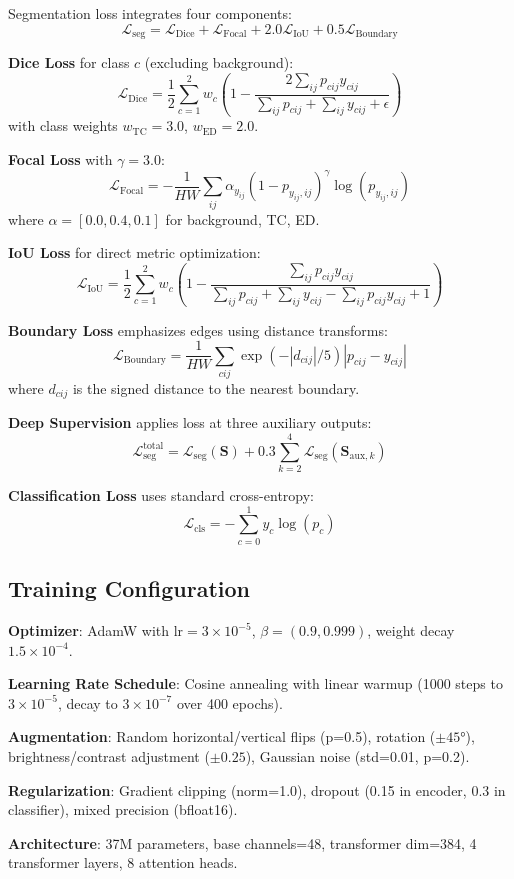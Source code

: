 Segmentation loss integrates four components:
\begin{equation}
\mathcal{L}_{\text{seg}} = \mathcal{L}_{\text{Dice}} + \mathcal{L}_{\text{Focal}} + 2.0\mathcal{L}_{\text{IoU}} + 0.5\mathcal{L}_{\text{Boundary}}
\label{eq:seg_loss}
\end{equation}

\textbf{Dice Loss} for class $c$ (excluding background):
\[
\mathcal{L}_{\text{Dice}} = \frac{1}{2}\sum_{c=1}^{2} w_c \left(1 - \frac{2\sum_{ij} p_{cij} y_{cij}}{\sum_{ij} p_{cij} + \sum_{ij} y_{cij} + \epsilon}\right)
\]
with class weights $w_{\text{TC}}=3.0$, $w_{\text{ED}}=2.0$.

\textbf{Focal Loss} with $\gamma=3.0$:
\[
\mathcal{L}_{\text{Focal}} = -\frac{1}{HW}\sum_{ij} \alpha_{y_{ij}} (1-p_{y_{ij},ij})^{\gamma} \log(p_{y_{ij},ij})
\]
where $\alpha = [0.0, 0.4, 0.1]$ for background, TC, ED.

\textbf{IoU Loss} for direct metric optimization:
\[
\mathcal{L}_{\text{IoU}} = \frac{1}{2}\sum_{c=1}^{2} w_c \left(1 - \frac{\sum_{ij} p_{cij} y_{cij}}{\sum_{ij} p_{cij} + \sum_{ij} y_{cij} - \sum_{ij} p_{cij} y_{cij} + 1}\right)
\]

\textbf{Boundary Loss} emphasizes edges using distance transforms:
\[
\mathcal{L}_{\text{Boundary}} = \frac{1}{HW}\sum_{cij} \exp(-|d_{cij}|/5) |p_{cij} - y_{cij}|
\]
where $d_{cij}$ is the signed distance to the nearest boundary.

\textbf{Deep Supervision} applies loss at three auxiliary outputs:
\[
\mathcal{L}_{\text{seg}}^{\text{total}} = \mathcal{L}_{\text{seg}}(\mathbf{S}) + 0.3\sum_{k=2}^{4} \mathcal{L}_{\text{seg}}(\mathbf{S}_{\text{aux},k})
\]

\textbf{Classification Loss} uses standard cross-entropy:
\[
\mathcal{L}_{\text{cls}} = -\sum_{c=0}^{1} y_c \log(p_c)
\]

\subsection{Training Configuration}

\textbf{Optimizer}: AdamW with $\text{lr}=3\times10^{-5}$, $\beta=(0.9, 0.999)$, weight decay $1.5\times10^{-4}$.

\textbf{Learning Rate Schedule}: Cosine annealing with linear warmup (1000 steps to $3\times10^{-5}$, decay to $3\times10^{-7}$ over 400 epochs).

\textbf{Augmentation}: Random horizontal/vertical flips (p=0.5), rotation ($\pm45°$), brightness/contrast adjustment ($\pm0.25$), Gaussian noise (std=0.01, p=0.2).

\textbf{Regularization}: Gradient clipping (norm=1.0), dropout (0.15 in encoder, 0.3 in classifier), mixed precision (bfloat16).

\textbf{Architecture}: 37M parameters, base channels=48, transformer dim=384, 4 transformer layers, 8 attention heads.
